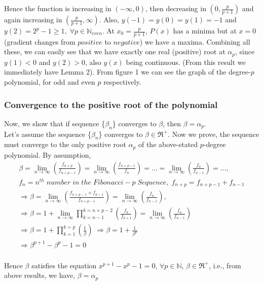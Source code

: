 \documentclass{ijcsa}
\begin{document}
		Hence the function is increasing in $(-\infty, 0)$, then decreasing in $\left(0, \frac{p}{p+1}\right)$ and again 
		increasing in $\left(\frac{p}{p+1}, \infty \right)$.	Also, $y(-1)=y(0)=y(1)=-1$  and $y(2)=2^{p}-1\geq 1, \; \forall{p} 	
		\in \mathbb{N}_{even}$. At $x_{0} = \frac{p}{p+1}$, $P(x)$ has a minima but at $x=0$ (gradient changes from $positive$ to $negative$) we 
		have a maxima. Combining all these, we can easily see that we have exactly one real (positive) root at $\alpha_{p}$, since
		$y(1)<0$ and $y(2)>0$, also $y(x)$ being continuous. (From this result we immediately have Lemma 2). From figure 1		
		we can see the graph of the degree-$p$ polynomial, for odd and even $p$ respectively.

\subsubsection*{Convergence to the positive root of the polynomial}
Now, we show that if sequence \{$\beta_{n}$\} converges to $\beta$, then $\beta=\alpha_{p}$. \\

Let's assume the sequence \{$\beta_{n}$\} converges to $\beta \in \Re^{+}$. Now we prove, the sequence must converge to the only positive root $\alpha_{p}$ of the above-stated $p$-degree polynomial. By assumption,
\begin{eqnarray*}
\beta=\lim_{n \rightarrow \infty}{\left(\frac{f_{n+p}}{f_{n+p-1}}\right)}= \lim_{n \rightarrow \infty}{\left(\frac{f_{n+p-1}}{f_{n}}\right)}
= \ldots = \lim_{n \rightarrow \infty}{\left(\frac{f_{n}}{f_{n-1}}\right)}=\ldots,\\
f_{n}=n^{th}\;number\;in\;the\;Fibonacci-p\;Sequence,\; f_{n+p}=f_{n+p-1}+f_{n-1}\\
\Rightarrow \beta=\lim_{n \rightarrow \infty}{\left(\frac{f_{n+p-1}+f_{n-1}}{f_{n+p-1}}\right)}
= \lim_{n \rightarrow \infty}{\left(\frac{f_{n}}{f_{n-1}}\right)},\;\\
\Rightarrow \beta
=1+\lim_{n \rightarrow \infty}{\prod_{k=n-1}^{k=n+p-2} {\left(\frac{f_{k}}{f_{k+1}}\right)}}= \lim_{n \rightarrow \infty}{\left(\frac{f_{n}}{f_{n-1}}\right)}	\\
\Rightarrow \beta=1+\prod_{k=1}^{k=p}\left(\frac{1}{\beta}\right)\;\Rightarrow \beta=1+\frac{1}{\beta^{p}}\\
\Rightarrow \beta^{p+1}-\beta^{p}-1=0 \\
\label{lemma1Proof}
\end{eqnarray*}

Hence $\beta$ satisfies the equation $x^{p+1}-x^{p}-1=0$, $\forall{p} \in \mathbb{N}$, $\beta \in \Re^{+}$, i.e.,
from above results, we have, $\beta = \alpha_{p}$
\end{document}
